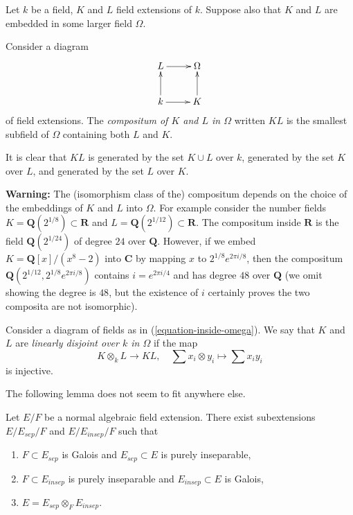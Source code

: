 \noindent
Let $k$ be a field, $K$ and $L$ field extensions of $k$.
Suppose also that $K$ and $L$ are embedded in some larger field $\Omega$.

\begin{definition}
\label{definition-compositum}
Consider a diagram
\begin{equation}
\label{equation-inside-omega}
\vcenter{
\xymatrix{
L \ar[r] & \Omega \\
k \ar[r] \ar[u] & K \ar[u]
}
}
\end{equation}
of field extensions. The {\it compositum of $K$ and $L$ in $\Omega$}
written $KL$ is the smallest subfield of $\Omega$ containing both
$L$ and $K$.
\end{definition}

\noindent
It is clear that $KL$ is generated by the set $K \cup L$ over $k$,
generated by the set $K$ over $L$, and generated by the set $L$ over $K$.

\medskip\noindent
{\bf Warning:} The (isomorphism class of the) compositum depends on
the choice of the embeddings of $K$ and $L$ into $\Omega$. For example
consider the number fields $K = \mathbf{Q}(2^{1/8}) \subset \mathbf{R}$ and
$L = \mathbf{Q}(2^{1/12}) \subset \mathbf{R}$. The compositum inside
$\mathbf{R}$ is the field $\mathbf{Q}(2^{1/24})$ of degree $24$ over
$\mathbf{Q}$. However, if we embed $K = \mathbf{Q}[x]/(x^8 - 2)$ into
$\mathbf{C}$ by mapping $x$ to $2^{1/8}e^{2\pi i/8}$, then the compositum
$\mathbf{Q}(2^{1/12}, 2^{1/8}e^{2\pi i/8})$ contains $i = e^{2\pi i/4}$ and has
degree $48$ over $\mathbf{Q}$ (we omit showing the degree is $48$, but
the existence of $i$ certainly proves the two composita are not isomorphic).

\begin{definition}
\label{definition-linearly-disjoint}
Consider a diagram of fields as in (\ref{equation-inside-omega}).
We say that $K$ and $L$ are {\it linearly disjoint over $k$ in $\Omega$}
if the map
$$
K \otimes_k L \longrightarrow KL,\quad
\sum x_i \otimes y_i \longmapsto \sum x_i y_i
$$
is injective.
\end{definition}

\noindent
The following lemma does not seem to fit anywhere else.

\begin{lemma}
\label{lemma-normal-case}
Let $E/F$ be a normal algebraic field extension. There exist subextensions
$E / E_{sep} /F$ and $E / E_{insep} / F$ such that
\begin{enumerate}
\item $F \subset E_{sep}$ is Galois and $E_{sep} \subset E$
is purely inseparable,
\item $F \subset E_{insep}$ is purely inseparable and $E_{insep} \subset E$
is Galois,
\item $E = E_{sep} \otimes_F E_{insep}$.
\end{enumerate}
\end{lemma}

